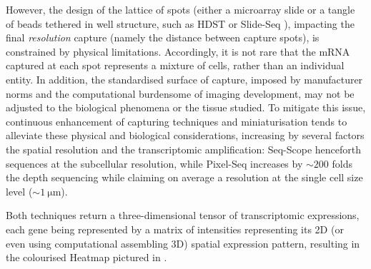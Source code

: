 \begin{itemize}
    However, the design of the lattice of spots (either a microarray slide or a tangle of beads tethered in well structure, such as HDST \autocite{vickovic_etal19} or Slide-Seq \autocite{rodriques_etal19}), impacting the final \emph{resolution} capture (namely the distance between capture spots), is constrained by physical limitations. Accordingly, it is not rare that the mRNA captured at each spot represents a mixture of cells, rather than an individual entity. In addition, the standardised surface of capture, imposed by manufacturer norms and the computational burdensome of imaging development, may not be adjusted to the biological phenomena or the tissue studied.  
    To mitigate this issue, continuous enhancement of capturing techniques and miniaturisation tends to alleviate these physical and biological considerations, increasing by several factors the spatial resolution and the transcriptomic amplification:  Seq-Scope \autocite{cho_etal21} henceforth sequences at the subcellular resolution, while Pixel-Seq \autocite{fu_etal21} increases by $\sim 200$ folds the depth sequencing while claiming on average a resolution at the single cell size level ($\sim \SI{1}{\micro \metre}$).
    
\end{itemize}

Both techniques return a three-dimensional tensor of transcriptomic expressions, each gene being represented by a matrix of intensities representing its 2D (or even using computational assembling 3D) spatial expression pattern, resulting in the colourised Heatmap pictured in . 


